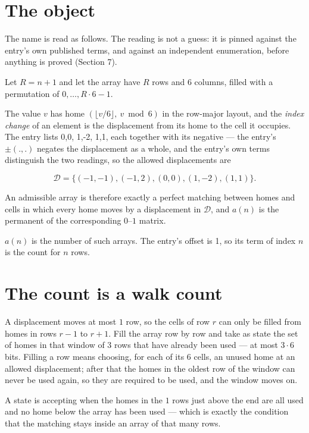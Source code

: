\documentclass[11pt]{article}
\theoremstyle{definition}
\begin{document}
\section{The object}

The name is read as follows. The reading is not a guess: it is pinned against the entry's own published terms, and against an independent enumeration, before anything is proved (Section 7).

Let $R = n + 1$ and let the array have $R$ rows and $6$ columns, filled with a permutation of $0,\dots,R\cdot6-1$.

The value $v$ has home $(\lfloor v/6\rfloor,\ v \bmod 6)$ in the row-major layout, and the {\itshape index change} of an element is the displacement from its home to the cell it occupies. The entry lists 0,0, 1,-2, 1,1, each together with its negative --- the entry's $\pm(.,.)$ negates the displacement as a whole, and the entry's own terms distinguish the two readings, so the allowed displacements are

\[\mathcal{D} = \{(-1,-1), (-1,2), (0,0), (1,-2), (1,1)\}.\]

An admissible array is therefore exactly a perfect matching between homes and cells in which every home moves by a displacement in $\mathcal{D}$, and $a(n)$ is the permanent of the corresponding $0$--$1$ matrix.

$a(n)$ is the number of such arrays. The entry's offset is 1, so its term of index $n$ is the count for $n$ rows.

\section{The count is a walk count}

A displacement moves at most $1$ row, so the cells of row $r$ can only be filled from homes in rows $r-1$ to $r+1$. Fill the array row by row and take as state the set of homes in that window of $3$ rows that have already been used --- at most $3\cdot6$ bits. Filling a row means choosing, for each of its $6$ cells, an unused home at an allowed displacement; after that the homes in the oldest row of the window can never be used again, so they are required to be used, and the window moves on.

A state is accepting when the homes in the $1$ rows just above the end are all used and no home below the array has been used --- which is exactly the condition that the matching stays inside an array of that many rows.
\end{document}

